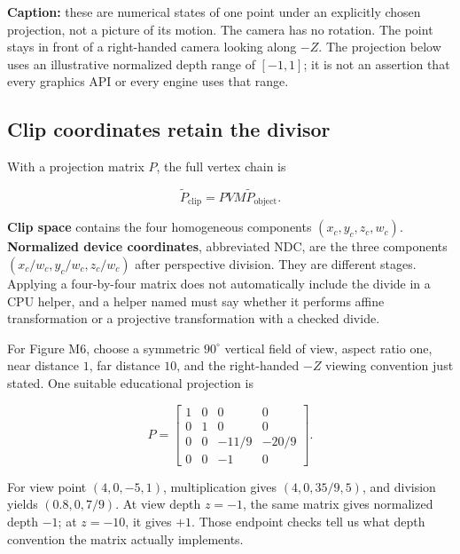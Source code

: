 \hypertarget{01-foundations-i-ch019-figure-m6---follow-one-point-through-named-spaces}{}


\textbf{Caption:} these are numerical states of one point under an explicitly chosen projection, not a picture of its motion. The camera has no rotation. The point stays in front of a right-handed camera looking along \(-Z\). The projection below uses an illustrative normalized depth range of \([-1,1]\); it is not an assertion that every graphics API or every engine uses that range.

\subsection{Clip coordinates retain the divisor}\label{01-foundations-i-ch019-clip-coordinates-retain-the-divisor}

\hypertarget{01-foundations-i-ch019-clip-coordinates-retain-the-divisor}{}

With a projection matrix \(P\), the full vertex chain is

\[
\widetilde P_{\mathrm{clip}}=PVM\widetilde P_{\mathrm{object}}.
\]

\textbf{Clip space} contains the four homogeneous components \((x_c,y_c,z_c,w_c)\). \textbf{Normalized device coordinates}, abbreviated NDC, are the three components \((x_c/w_c,y_c/w_c,z_c/w_c)\) after perspective division. They are different stages. Applying a four-by-four matrix does not automatically include the divide in a CPU helper, and a helper named  must say whether it performs affine transformation or a projective transformation with a checked divide.

For Figure M6, choose a symmetric \(90^\circ\) vertical field of view, aspect ratio one, near distance \(1\), far distance \(10\), and the right-handed \(-Z\) viewing convention just stated. One suitable educational projection is

\[
P=\begin{bmatrix}
1&0&0&0\\
0&1&0&0\\
0&0&-11/9&-20/9\\
0&0&-1&0
\end{bmatrix}.
\]

For view point \((4,0,-5,1)\), multiplication gives \((4,0,35/9,5)\), and division yields \((0.8,0,7/9)\). At view depth \(z=-1\), the same matrix gives normalized depth \(-1\); at \(z=-10\), it gives \(+1\). Those endpoint checks tell us what depth convention the matrix actually implements.

